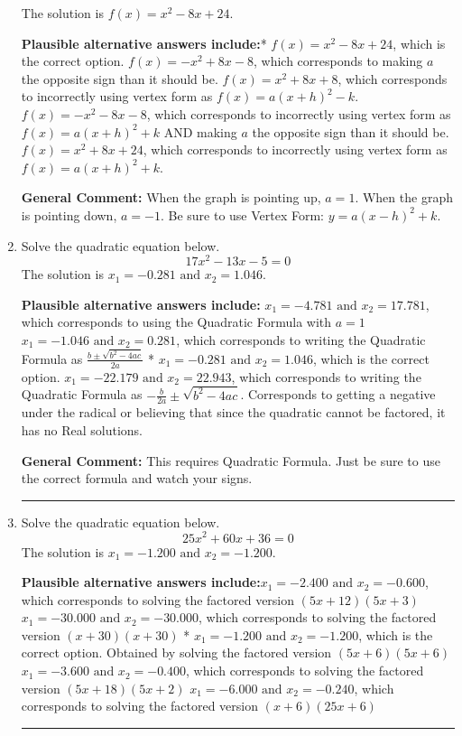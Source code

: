 \documentclass{extbook}[14pt]
\newcommand{\litem}[1]{\item #1

\rule{\textwidth}{0.4pt}}
\begin{document}
\begin{enumerate}
{The solution is \( f(x) = x^{2} -8 x + 24 \).\begin{enumerate}[label=\Alph*.]
\textbf{Plausible alternative answers include:}* $f(x)=x^{2} -8 x + 24$, which is the correct option.
$f(x)=-x^{2} +8 x -8$, which corresponds to making $a$ the opposite sign than it should be.
$f(x)=x^{2} +8 x + 8$, which corresponds to incorrectly using vertex form as $f(x) = a(x+h)^2 - k$.
$f(x)=-x^{2} -8 x -8$, which corresponds to incorrectly using vertex form as $f(x) = a(x+h)^2+k$ AND making $a$ the opposite sign than it should be.
$f(x)=x^{2} +8 x + 24$, which corresponds to incorrectly using vertex form as $f(x) = a(x+h)^2+k$.
\end{enumerate}

\textbf{General Comment:} When the graph is pointing up, $a=1$. When the graph is pointing down, $a=-1$. Be sure to use Vertex Form: $y = a(x-h)^2+k$.
}
\litem{
Solve the quadratic equation below.
\[ 17x^{2} -13 x -5 = 0 \]The solution is \( x_1 = -0.281 \text{ and } x_2 = 1.046 \).\begin{enumerate}[label=\Alph*.]
\textbf{Plausible alternative answers include:} $x_1 = -4.781 \text{ and } x_2 = 17.781$, which corresponds to using the Quadratic Formula with $a=1$
 $x_1 = -1.046 \text{ and } x_2 = 0.281$, which corresponds to writing the Quadratic Formula as $\frac{b \pm \sqrt{b^2 - 4ac}}{2a}$
* $x_1 = -0.281 \text{ and } x_2 = 1.046$, which is the correct option.
 $x_1 = -22.179 \text{ and } x_2 = 22.943$, which corresponds to writing the Quadratic Formula as $-\frac{b}{2a} \pm \sqrt{b^2 - 4ac}$.
Corresponds to getting a negative under the radical or believing that since the quadratic cannot be factored, it has no Real solutions.
\end{enumerate}

\textbf{General Comment:} This requires Quadratic Formula. Just be sure to use the correct formula and watch your signs.
}
\litem{
Solve the quadratic equation below.
\[ 25x^{2} +60 x + 36 = 0 \]The solution is \( x_1 = -1.200 \text{ and } x_2 = -1.200 \).\begin{enumerate}[label=\Alph*.]
\textbf{Plausible alternative answers include:}$x_1 = -2.400 \text{ and } x_2 = -0.600$, which corresponds to solving the factored version $(5x + 12)(5x + 3)$
$x_1 = -30.000 \text{ and } x_2 = -30.000$, which corresponds to solving the factored version $(x + 30)(x + 30)$
* $x_1 = -1.200 \text{ and } x_2 = -1.200$, which is the correct option. Obtained by solving the factored version $(5x + 6)(5x + 6)$
$x_1 = -3.600 \text{ and } x_2 = -0.400$, which corresponds to solving the factored version $(5x + 18)(5x + 2)$
$x_1 = -6.000 \text{ and } x_2 = -0.240$, which corresponds to solving the factored version $(x + 6)(25x + 6)$
\end{enumerate}

}
\end{enumerate}
\end{document}
